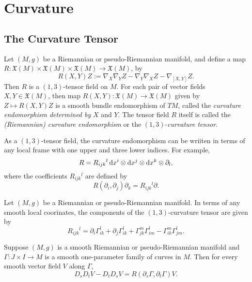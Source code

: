 \section{Curvature}
\label{section-curvature}

\subsection{The Curvature Tensor}
\label{subsection-the-curvature-tensor}

\begin{definition}
  \label{definition-curvature-endomorphism}
  Let \( (M, g) \) be a Riemannian or pseudo-Riemannian manifold, and define a map \( R: \mathfrak{X}(M) \times \mathfrak{X}(M) \times \mathfrak{X}(M) \to \mathfrak{X}(M) \), by
  \[
    R(X, Y) Z := \nabla_X \nabla_Y Z - \nabla_Y \nabla_X Z - \nabla_{[X, Y]} Z.
  \]
  Then \( R \) is a \( (1, 3) \)-tensor field on \( M \).
  For each pair of vector fields \( X, Y \in \mathfrak{X}(M) \), then map \( R(X, Y): \mathfrak{X}(M) \to \mathfrak{X}(M) \) given by \( Z \mapsto R(X, Y) Z \) is a smooth bundle endomorphism of \( TM \), called the \emph{curvature endomorphism determined by } \( X \) and \( Y \).
  The tensor field \( R \) itself is called the \emph{(Riemannian) curvature endomorphism} or the \( (1, 3) \)-\emph{curvature tensor}.
\end{definition}
\begin{remark}
  \label{remark-curvature-endomorphism}
  As a \( (1, 3) \)-tensor field, the curvature endomorphism can be wriiten in terms of any local frame with one upper and three lower indices.
  For example,
  \[
    R = R_{ijk}{}^l \mathop{}\!\mathrm{d} x^i \otimes \mathop{}\!\mathrm{d} x^j \otimes \mathop{}\!\mathrm{d} x^k \otimes \partial_l,
  \]
  where the coefficients \( R_{ijk}{}^l \) are defined by
  \[
    R(\partial_i, \partial_j)\partial_k = R_{ijk}{}^l \partial.
  \]
\end{remark}

\begin{proposition}
  \label{proposition-curvature-component-in-coorinates}
  Let \( (M, g) \) be a Riemannian or pseudo-Riemannian manifold.
  In terms of any smooth local coorinates, the components of the \( (1, 3) \)-curvature tensor are given by
  \[
    R_{ijk}{}^l = \partial_i \Gamma^l_{ik} + \partial_j \Gamma_{ik}^l + \Gamma^m_{jk}\Gamma^l_{im} - \Gamma^m_{ik} \Gamma^l_{jm}.
  \]
\end{proposition}

\begin{proposition}
  \label{proposition-symmetric-variation}
  Suppose \( (M, g) \) is a smooth Riemannian or pseudo-Riemannian manifold and \( \Gamma: J \times I \to M \) is a smooth one-parameter family of curves in \( M \).
  Then for every smooth vector field \( V \) along \( \Gamma \),
  \[
    D_s D_t V - D_t D_s V = R(\partial_s \Gamma, \partial_t \Gamma) V.
  \]
\end{proposition}

